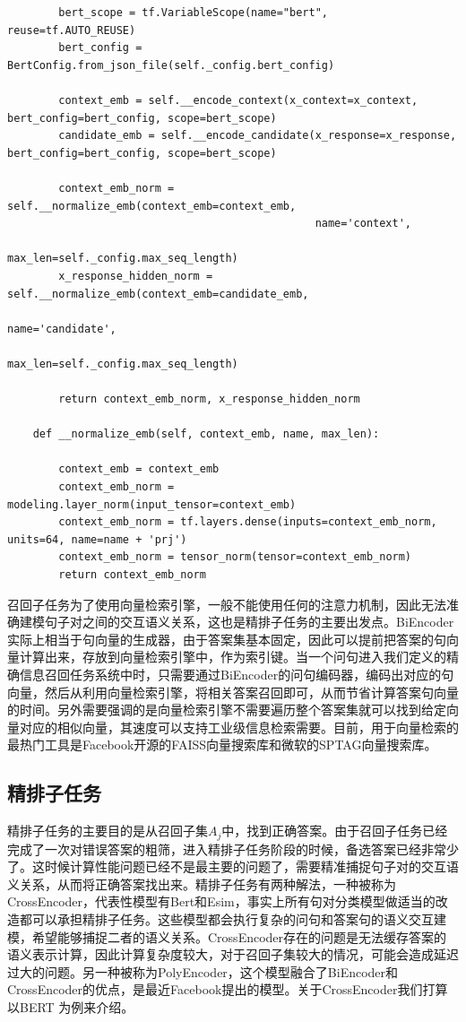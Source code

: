 \documentclass[twoside,a4paper,12pt]{book}%
\begin{document}
\begin{lstlisting}
        bert_scope = tf.VariableScope(name="bert", reuse=tf.AUTO_REUSE)
        bert_config = BertConfig.from_json_file(self._config.bert_config)

        context_emb = self.__encode_context(x_context=x_context, bert_config=bert_config, scope=bert_scope)
        candidate_emb = self.__encode_candidate(x_response=x_response, bert_config=bert_config, scope=bert_scope)

        context_emb_norm = self.__normalize_emb(context_emb=context_emb,
                                                name='context',
                                                max_len=self._config.max_seq_length)
        x_response_hidden_norm = self.__normalize_emb(context_emb=candidate_emb,
                                                      name='candidate',
                                                      max_len=self._config.max_seq_length)

        return context_emb_norm, x_response_hidden_norm

    def __normalize_emb(self, context_emb, name, max_len):

        context_emb = context_emb
        context_emb_norm = modeling.layer_norm(input_tensor=context_emb)
        context_emb_norm = tf.layers.dense(inputs=context_emb_norm, units=64, name=name + 'prj')
        context_emb_norm = tensor_norm(tensor=context_emb_norm)
        return context_emb_norm
\end{lstlisting}
召回子任务为了使用向量检索引擎，一般不能使用任何的注意力机制，因此无法准确建模句子对之间的交互语义关系，这也是精排子任务的主要出发点。BiEncoder实际上相当于句向量的生成器，由于答案集基本固定，因此可以提前把答案的句向量计算出来，存放到向量检索引擎中，作为索引键。当一个问句进入我们定义的精确信息召回任务系统中时，只需要通过BiEncoder的问句编码器，编码出对应的句向量，然后从利用向量检索引擎，将相关答案召回即可，从而节省计算答案句向量的时间。另外需要强调的是向量检索引擎不需要遍历整个答案集就可以找到给定向量对应的相似向量，其速度可以支持工业级信息检索需要。目前，用于向量检索的最热门工具是Facebook开源的FAISS向量搜索库和微软的SPTAG向量搜索库。

\subsection{精排子任务}
精排子任务的主要目的是从召回子集$A_j$中，找到正确答案。由于召回子任务已经完成了一次对错误答案的粗筛，进入精排子任务阶段的时候，备选答案已经非常少了。这时候计算性能问题已经不是最主要的问题了，需要精准捕捉句子对的交互语义关系，从而将正确答案找出来。精排子任务有两种解法，一种被称为CrossEncoder，代表性模型有Bert和Esim，事实上所有句对分类模型做适当的改造都可以承担精排子任务。这些模型都会执行复杂的问句和答案句的语义交互建模，希望能够捕捉二者的语义关系。CrossEncoder存在的问题是无法缓存答案的语义表示计算，因此计算复杂度较大，对于召回子集较大的情况，可能会造成延迟过大的问题。另一种被称为PolyEncoder，这个模型融合了BiEncoder和CrossEncoder的优点，是最近Facebook提出的模型。关于CrossEncoder我们打算以BERT 为例来介绍。
\end{document}
